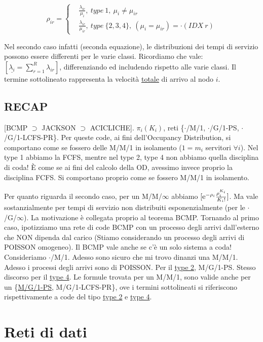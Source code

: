 \[
	\rho_{ir} = \left\{
	\begin{aligned}
	&\frac{\lambda_{ir}}{\mu_i},\ type\ 1,\ \mu_i\neq\mu_{ir}\\
	&\frac{\lambda_{ir}}{\mu_{ir}},\ type\ \{2,3,4\},\ (\mu_i=\mu_{ir}) = \mathord{\cdot}(IDX\ r)
	\end{aligned}
	\right.
\]

Nel secondo caso infatti (seconda equazione), le distribuzioni dei tempi di servizio possono essere differenti per le varie classi. Ricordiamo che vale: $[\underline{\lambda_i}=\sum_{r=1}^R{\lambda_{ir}}]$, differenziando ed includendo rispetto alle varie classi.  Il termine sottolineato rappresenta la velocità \underline{totale} di arrivo al nodo $i$.

\subsection{RECAP}

[BCMP $\supset$ JACKSON $\supset$ ACICLICHE]. $\pi_i(K_i)$, reti \{$\mathord{\cdot}$/M/1, $\mathord{\cdot}$/G/1-PS, $\mathord{\cdot}$/G/1-LCFS-PR\}. Per queste code, ai fini dell'Occupancy Distribution, si comportano come se fossero delle M/M/1 in isolamento ($1=m_i$ servitori $\forall i$). Nel type 1 abbiamo la FCFS, mentre nel type 2, type 4 non abbiamo quella disciplina di coda! \`E come se ai fini del calcolo della OD, avessimo invece proprio la disciplina FCFS. Si comportano proprio come se fossero M/M/1 in isolamento.

Per quanto riguarda il secondo caso, per un M/M/$\infty$ abbiamo $[\mathop{}\!\mathrm{e}^{-\rho_i}\frac{\rho_i^{K_i}}{K_i!}]$. Ma vale sostanzialmente per tempi di servizio non distribuiti esponenzialmente (per le $\mathord{\cdot}$/G/$\infty$). La motivazione è collegata proprio al teorema BCMP. Tornando al primo caso, ipotizziamo una rete di code BCMP con un processo degli arrivi dall'esterno che NON dipenda dal carico (Stiamo considerando un processo degli arrivi di POISSON omogeneo). Il BCMP vale anche se c'è un solo sistema a coda! Consideriamo $\mathord{\cdot}$/M/1. Adesso sono sicuro che mi trovo dinanzi una M/M/1. Adesso i processi degli arrivi sono di POISSON. Per il \underline{type 2}, M/G/1-PS. Stesso discorso per il \underline{type 4}. Le formule trovata per un M/M/1, sono valide anche per un \{\underline{M/G/1-PS}, {M/G/1-LCFS-PR}\}, ove i termini sottolineati si riferiscono rispettivamente a code del tipo \underline{type 2} e \underline{type 4}.


\section{Reti di dati}

